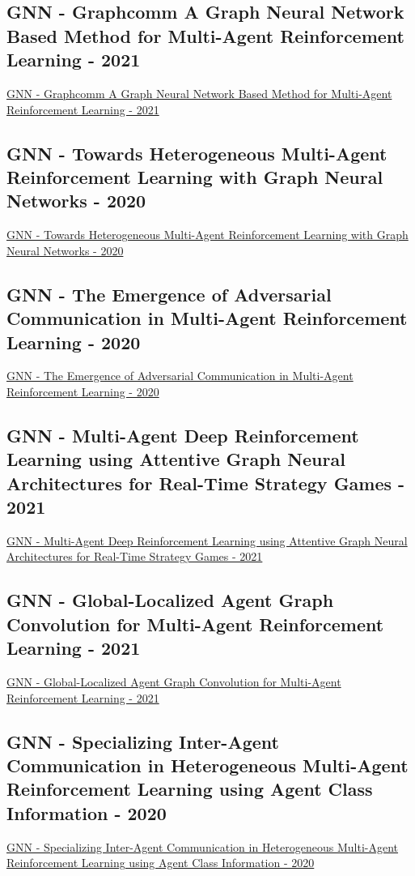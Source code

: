 \subsection{GNN - Graphcomm A Graph Neural Network Based Method for Multi-Agent Reinforcement Learning - 2021}
\href{https://ieeexplore.ieee.org/abstract/document/9413716}{GNN - Graphcomm A Graph Neural Network Based Method for Multi-Agent Reinforcement Learning - 2021}

\subsection{GNN - Towards Heterogeneous Multi-Agent Reinforcement Learning with Graph Neural Networks - 2020}
\href{https://arxiv.org/abs/2009.13161}{GNN - Towards Heterogeneous Multi-Agent Reinforcement Learning with Graph Neural Networks - 2020}

\subsection{GNN - The Emergence of Adversarial Communication in Multi-Agent Reinforcement Learning - 2020}
\href{https://arxiv.org/abs/2008.02616}{GNN - The Emergence of Adversarial Communication in Multi-Agent Reinforcement Learning - 2020}

\subsection{GNN - Multi-Agent Deep Reinforcement Learning using Attentive Graph Neural Architectures for Real-Time Strategy Games - 2021}
\href{https://arxiv.org/abs/2105.10211}{GNN - Multi-Agent Deep Reinforcement Learning using Attentive Graph Neural Architectures for Real-Time Strategy Games - 2021}

\subsection{GNN - Global-Localized Agent Graph Convolution for Multi-Agent Reinforcement Learning - 2021}
\href{https://ieeexplore.ieee.org/abstract/document/9414993}{GNN - Global-Localized Agent Graph Convolution for Multi-Agent Reinforcement Learning - 2021}

\subsection{GNN - Specializing Inter-Agent Communication in Heterogeneous Multi-Agent Reinforcement Learning using Agent Class Information - 2020}
\href{https://arxiv.org/abs/2012.07617}{GNN - Specializing Inter-Agent Communication in Heterogeneous Multi-Agent Reinforcement Learning using Agent Class Information - 2020}

